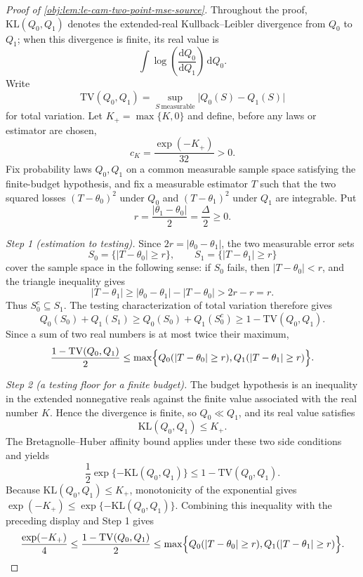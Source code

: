 \documentclass[11pt]{article}
\begin{document}
\begin{proof}[Proof of \cref{obj:lem:le-cam-two-point-mse-source}]
Throughout the proof, \(\mathrm{KL}(Q_0,Q_1)\) denotes the extended-real
Kullback--Leibler divergence from \(Q_0\) to \(Q_1\); when this divergence is finite, its real value is
\[
\int \log\!\left(\frac{\mathrm d Q_0}{\mathrm d Q_1}\right)\,\mathrm dQ_0 .
\]
Write
\[
\mathrm{TV}(Q_0,Q_1)
=
\sup_{S\ \mathrm{measurable}}\bigl|Q_0(S)-Q_1(S)\bigr|
\]
for total variation. Let \(K_+=\max\{K,0\}\) and define, before any laws or estimator are chosen,
\[
c_K=\frac{\exp(-K_+)}{32}>0 .
\]
Fix probability laws \(Q_0,Q_1\) on a common measurable sample space satisfying the finite-budget
hypothesis, and fix a measurable estimator \(T\) such that the two squared losses
\((T-\theta_0)^2\) under \(Q_0\) and \((T-\theta_1)^2\) under \(Q_1\) are integrable. Put
\[
r=\frac{|\theta_1-\theta_0|}{2}=\frac{\Delta}{2}\ge 0 .
\]

\emph{Step 1 (estimation to testing).} Since \(2r=|\theta_0-\theta_1|\), the two measurable error
sets
\[
S_0=\{|T-\theta_0|\ge r\},
\qquad
S_1=\{|T-\theta_1|\ge r\}
\]
cover the sample space in the following sense: if \(S_0\) fails, then
\(|T-\theta_0|<r\), and the triangle inequality gives
\[
|T-\theta_1|\ge |\theta_0-\theta_1|-|T-\theta_0|>2r-r=r .
\]
Thus \(S_0^c\subseteq S_1\). The testing characterization of total variation therefore gives
\[
Q_0(S_0)+Q_1(S_1)
\ge
Q_0(S_0)+Q_1(S_0^c)
\ge
1-\mathrm{TV}(Q_0,Q_1).
\]
Since a sum of two real numbers is at most twice their maximum,
\[
\frac{1-\mathrm{TV}(Q_0,Q_1)}{2}
\le
\max\Bigl\{
Q_0(|T-\theta_0|\ge r),
Q_1(|T-\theta_1|\ge r)
\Bigr\}.
\]

\emph{Step 2 (a testing floor for a finite budget).} The budget hypothesis is an inequality in the
extended nonnegative reals against the finite value associated with the real number \(K\). Hence the
divergence is finite, so \(Q_0\ll Q_1\), and its real value satisfies
\[
\mathrm{KL}(Q_0,Q_1)\le K_+ .
\]
The Bretagnolle--Huber affinity bound applies under these two side conditions and yields
\[
\frac12\exp\{-\mathrm{KL}(Q_0,Q_1)\}
\le
1-\mathrm{TV}(Q_0,Q_1).
\]
Because \(\mathrm{KL}(Q_0,Q_1)\le K_+\), monotonicity of the exponential gives
\(\exp(-K_+)\le \exp\{-\mathrm{KL}(Q_0,Q_1)\}\). Combining this inequality with the preceding
display and Step 1 gives
\[
\frac{\exp(-K_+)}{4}
\le
\frac{1-\mathrm{TV}(Q_0,Q_1)}{2}
\le
\max\Bigl\{
Q_0(|T-\theta_0|\ge r),
Q_1(|T-\theta_1|\ge r)
\Bigr\}.
\]


\end{proof}
\end{document}
